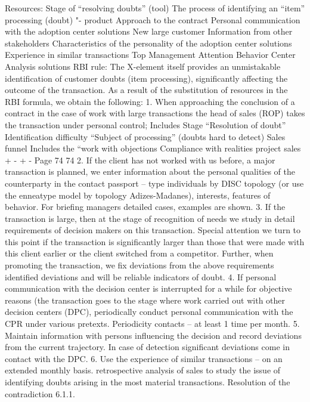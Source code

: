 Resources:
Stage of “resolving doubts”
(tool)
The process of identifying an “item”
processing (doubt) "- product
Approach to the contract
Personal communication with the adoption center
solutions
New large customer
Information from other stakeholders
Characteristics of the personality of the adoption center
solutions
Experience in similar transactions
Top Management Attention
Behavior Center Analysis
solutions
RBI rule:
The X-element itself provides an unmistakable identification of customer doubts (item
processing), significantly affecting the outcome of the transaction.
As a result of the substitution of resources in the RBI formula, we obtain the following:
1. When approaching the conclusion of a contract in the case of work with large transactions
the head of sales (ROP) takes the transaction under personal control;
Includes Stage
“Resolution of doubt”
Identification difficulty
“Subject of processing” (doubts
hard to detect)
Sales funnel
Includes the “work with
objections
Compliance with realities
project sales
+
-
+
-
Page 74
74
2. If the client has not worked with us before, a major transaction is planned,
we enter information about the personal qualities of the counterparty in the contact passport -- type
individuals by DISC topology (or use the enneatype model by topology
Adizes-Madanes), interests, features of behavior. For briefing
managers detailed cases, examples are shown.
3. If the transaction is large, then at the stage of recognition of needs we study in detail
requirements of decision makers on this transaction. Special attention
we turn to this point if the transaction is significantly larger than those that were made with
this client earlier or the client switched from a competitor. Further, when
promoting the transaction, we fix deviations from the above requirements identified
deviations and will be reliable indicators of doubt.
4. If personal communication with the decision center is interrupted for a while
for objective reasons (the transaction goes to the stage where work
carried out with other decision centers (DPC), periodically
conduct personal communication with the CPR under various pretexts. Periodicity
contacts -- at least 1 time per month.
5. Maintain information with persons influencing the decision and record
deviations from the current trajectory. In case of detection
significant deviations come in contact with the DPC.
6. Use the experience of similar transactions -- on an extended monthly basis.
retrospective analysis of sales
to study the issue of identifying doubts arising in the most
material transactions.
Resolution of the contradiction 6.1.1.
